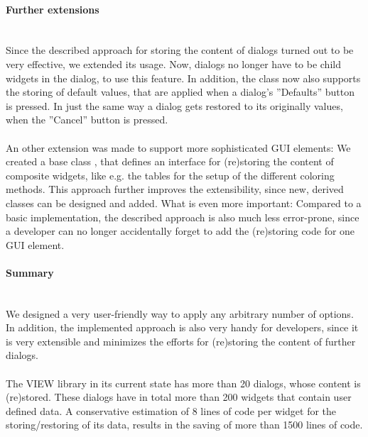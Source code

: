 \paragraph{Further extensions}
\hspace*{\fill}\\
Since the described approach for storing the content of dialogs turned out to be very 
effective, we extended its usage. 
Now, dialogs no longer have to be child widgets in the 
 dialog, to use this feature.
In addition, the  class now also supports the storing of default 
values, that are applied when a dialog's ''Defaults'' button is pressed.
In just the same way a dialog gets restored to its originally values, when the ''Cancel'' 
button is pressed.\\
\\
An other extension was made to support more sophisticated
GUI elements: We created a base class , that defines an 
interface for (re)storing the content of composite widgets, like e.g. the tables for the 
setup of the different coloring methods. This approach further improves the 
extensibility, since new, derived  classes can be designed
and added.
What is even more important: Compared to a basic implementation, the described approach is also much less error-prone, since a developer 
can no longer accidentally forget to add the (re)storing code for one GUI element.

\paragraph{Summary}
\hspace*{\fill}\\
We designed a very user-friendly way to apply any arbitrary number of options. 
In addition, the implemented approach is also very handy for developers, since it
is very extensible and minimizes the efforts for (re)storing the content of further dialogs. 
\\
\\
The VIEW library in its current state has more than 20 dialogs, whose content is (re)stored. 
These dialogs have in total more than 200 widgets that contain user defined data.
A conservative estimation of 8 lines of code per widget for the storing/restoring of its data, results in 
the saving of more than 1500 lines of code.
